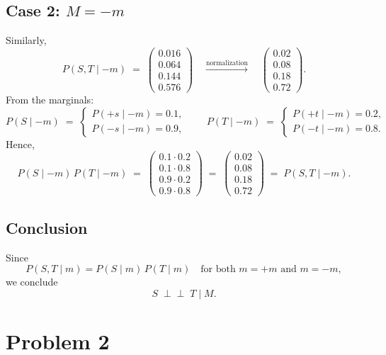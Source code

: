 \documentclass[11pt]{article}
\begin{document}
\subsection*{Case 2: \(M = -m\)}

Similarly,
\[
  P(S,T \mid -m) 
  \;=\;
  \begin{pmatrix}
    0.016\\
    0.064\\
    0.144\\
    0.576
  \end{pmatrix}
  \quad\xrightarrow{\text{normalization}}\quad
  \begin{pmatrix}
    0.02\\
    0.08\\
    0.18\\
    0.72
  \end{pmatrix}.
\]
From the marginals:
\[
  P(S \mid -m) 
  \;=\;
  \begin{cases}
    P(+s \mid -m) = 0.1,\\
    P(-s \mid -m) = 0.9,
  \end{cases}
  \qquad
  P(T \mid -m) 
  \;=\;
  \begin{cases}
    P(+t \mid -m) = 0.2,\\
    P(-t \mid -m) = 0.8.
  \end{cases}
\]
Hence,
\[
  P(S \mid -m)\,P(T \mid -m) 
  \;=\;
  \begin{pmatrix}
    0.1 \cdot 0.2\\[4pt]
    0.1 \cdot 0.8\\[4pt]
    0.9 \cdot 0.2\\[4pt]
    0.9 \cdot 0.8
  \end{pmatrix}
  \;=\;
  \begin{pmatrix}
    0.02\\
    0.08\\
    0.18\\
    0.72
  \end{pmatrix}
  \;=\;
  P(S,T \mid -m).
\]

\subsection*{Conclusion}
Since
\[
  P(S,T \mid m) = P(S\mid m)\,P(T\mid m)
  \quad
  \text{for both } m = +m \text{ and } m = -m,
\]
we conclude 
\[
  S \;\perp\!\!\!\perp\; T \;\big|\; M.
\]

\newpage

\section*{Problem 2}
\end{document}
